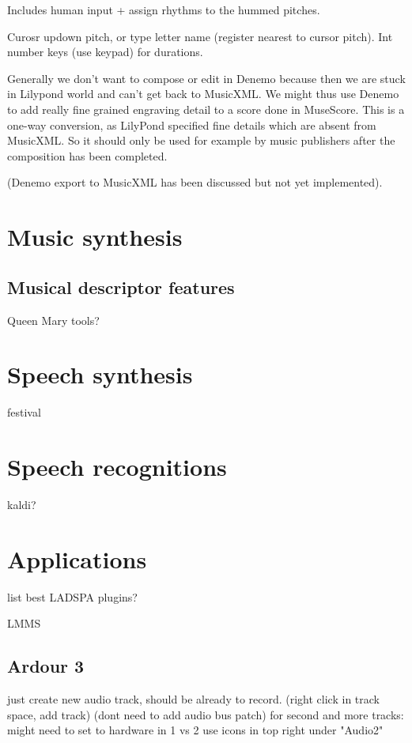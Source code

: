 \documentclass[oneside,english]{scrbook}
\begin{document}
Includes human input + assign rhythms to the hummed pitches.

Curosr updown pitch, or type letter name (register nearest to cursor pitch).  Int number keys (use keypad) for durations.

Generally we don't want to compose or edit in Denemo because then we are stuck in Lilypond world and can't get back to MusicXML.  We might thus use Denemo to add really fine grained engraving detail to a score done in MuseScore.  This is a one-way conversion, as LilyPond specified fine details which are absent from MusicXML.   So it should only be used for example by music publishers after the composition has been completed.

(Denemo export to MusicXML has been discussed but not yet implemented).
\chapter{Music synthesis}


\section{Musical descriptor features}
Queen Mary tools?
\chapter{Speech synthesis}

festival


\chapter{Speech recognitions}

kaldi?


\chapter{Applications}

list best LADSPA plugins?

LMMS

\section{Ardour 3}

just create new audio track, should be already to record. 
	(right click in track space, add track)
	(dont need to add audio bus patch) 
	for second and more tracks:
		might need to set to hardware in 1 vs 2
			use icons in top right under "Audio2"
\end{document}

